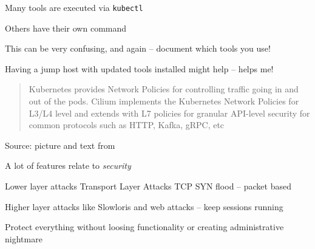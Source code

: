 \documentclass[Screen16to9,17pt]{foils}
\begin{document}


\begin{list2}
\item Many tools are executed via \verb+kubectl+
\item Others have their own command
\item This can be very confusing, and again -- document which tools you use!
\item Having a jump host with updated tools installed might help -- helps me!
\end{list2}



\begin{quote}
Kubernetes provides Network Policies for controlling traffic going in and out of the pods. Cilium implements the Kubernetes Network Policies for L3/L4 level and extends with L7 policies for granular API-level security for common protocols such as HTTP, Kafka, gRPC, etc
\end{quote}
Source: picture and text from 




\begin{list2}
\item A lot of features relate to \emph{security}
\end{list2}





\begin{list2}
\item Lower layer attacks Transport Layer Attacks TCP SYN flood -- packet based
\item Higher layer attacks like Slowloris and web attacks -- keep sessions running
\item Protect everything without loosing functionality or creating administrative nightmare
\end{list2}

\end{document}
